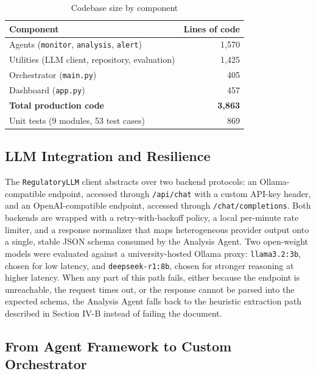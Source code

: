 \documentclass[conference]{IEEEtran}
\begin{document}
\begin{table}[t]
\caption{Codebase size by component}
\label{tab:codebase}
\centering
\begin{tabular}{|l|r|}
\hline
\textbf{Component} & \textbf{Lines of code} \\
\hline
Agents (\texttt{monitor}, \texttt{analysis}, \texttt{alert}) & 1{,}570 \\
\hline
Utilities (LLM client, repository, evaluation) & 1{,}425 \\
\hline
Orchestrator (\texttt{main.py}) & 405 \\
\hline
Dashboard (\texttt{app.py}) & 457 \\
\hline
\textbf{Total production code} & \textbf{3{,}863} \\
\hline
Unit tests (9 modules, 53 test cases) & 869 \\
\hline
\end{tabular}
\end{table}

\subsection{LLM Integration and Resilience}

The \texttt{RegulatoryLLM} client abstracts over two backend protocols: an Ollama-compatible endpoint, accessed through \texttt{/api/chat} with a custom API-key header, and an OpenAI-compatible endpoint, accessed through \texttt{/chat/completions}. Both backends are wrapped with a retry-with-backoff policy, a local per-minute rate limiter, and a response normalizer that maps heterogeneous provider output onto a single, stable JSON schema consumed by the Analysis Agent. Two open-weight models were evaluated against a university-hosted Ollama proxy: \texttt{llama3.2:3b}, chosen for low latency, and \texttt{deepseek-r1:8b}, chosen for stronger reasoning at higher latency. When any part of this path fails, either because the endpoint is unreachable, the request times out, or the response cannot be parsed into the expected schema, the Analysis Agent falls back to the heuristic extraction path described in Section IV-B instead of failing the document.

\subsection{From Agent Framework to Custom Orchestrator}
\end{document}
